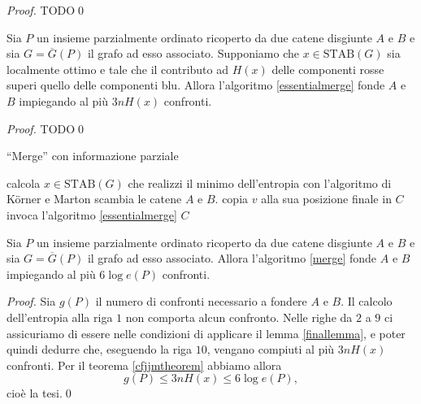 \begin{proof}
	TODO\qed 
\end{proof}
\begin{lemma}
	\label{finallemma} Sia \(P\) un insieme parzialmente ordinato ricoperto da due catene disgiunte \(A\) e \(B\) e sia \(G=\overline{G}(P)\) il grafo ad esso associato. Supponiamo che \(x\in\text{STAB}(G)\) sia localmente ottimo e tale che il contributo ad \(H(x)\) delle componenti rosse superi quello delle componenti blu. Allora l'algoritmo \ref{essentialmerge} fonde \(A\) e \(B\) impiegando al pi\`u \(3nH(x)\) confronti.
\end{lemma}
\begin{proof}
	TODO\qed 
\end{proof}
\begin{algorithm}
	\caption{``Merge'' con informazione parziale} \label{merge} 
	\begin{algorithmic}
		[1] \STATE calcola \(x\in\text{STAB}(G)\) che realizzi il minimo dell'entropia con l'algoritmo di K\"orner e Marton
		     \STATE scambia le catene \(A\) e \(B\). \ENDIF
		      \STATE copia \(v\) alla sua posizione finale in \(C\) \ENDIF \ENDFOR
		    \STATE invoca l'algoritmo \ref{essentialmerge}
		    \RETURN \(C\)
	\end{algorithmic}
\end{algorithm}
\begin{theorem}
	\label{mergetheorem} Sia \(P\) un insieme parzialmente ordinato ricoperto da due catene disgiunte \(A\) e \(B\) e sia \(G=\overline{G}(P)\) il grafo ad esso associato. Allora l'algoritmo \ref{merge} fonde \(A\) e \(B\) impiegando al più \(6\log{e(P)}\) confronti. 
\end{theorem}
\begin{proof}
	Sia \(g(P)\) il numero di confronti necessario a fondere \(A\) e \(B\). Il calcolo dell'entropia alla riga \(1\) non comporta alcun confronto. Nelle righe da \(2\) a \(9\) ci assicuriamo di essere nelle condizioni di applicare il lemma \ref{finallemma}, e poter quindi dedurre che, eseguendo la riga \(10\), vengano compiuti al pi\`u \(3nH(x)\) confronti. Per il teorema \ref{cfjjmtheorem} abbiamo allora
    \[g(P)\le 3nH(x)\le 6\log{e(P)},\]
    cio\`e la tesi.\qed 
\end{proof}

